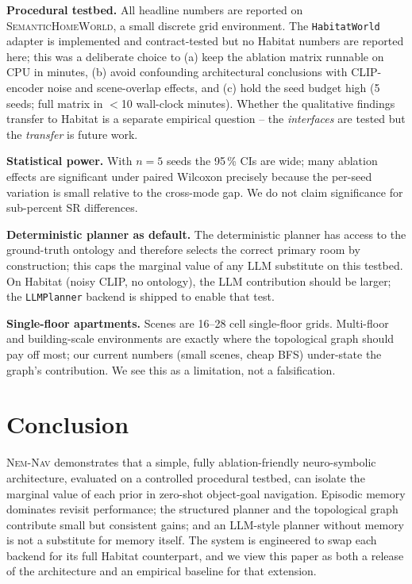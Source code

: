 \documentclass[conference,a4paper,10pt]{IEEEtran}
\begin{document}
\textbf{Procedural testbed.}
All headline numbers are reported on \textsc{SemanticHomeWorld}, a small
discrete grid environment. The \texttt{HabitatWorld} adapter is
implemented and contract-tested but no Habitat numbers are reported
here; this was a deliberate choice to (a) keep the ablation matrix
runnable on CPU in minutes, (b) avoid confounding architectural
conclusions with CLIP-encoder noise and scene-overlap effects, and
(c) hold the seed budget high (5 seeds; full matrix in
$<$10 wall-clock minutes). Whether the qualitative findings transfer
to Habitat is a separate empirical question -- the \emph{interfaces}
are tested but the \emph{transfer} is future work.

\textbf{Statistical power.}
With $n{=}5$ seeds the 95\,\% CIs are wide; many ablation effects are
significant under paired Wilcoxon precisely because the per-seed
variation is small relative to the cross-mode gap. We do not claim
significance for sub-percent SR differences.

\textbf{Deterministic planner as default.}
The deterministic planner has access to the ground-truth ontology and
therefore selects the correct primary room by construction; this caps
the marginal value of any LLM substitute on this testbed. On Habitat
(noisy CLIP, no ontology), the LLM contribution should be larger; the
\texttt{LLMPlanner} backend is shipped to enable that test.

\textbf{Single-floor apartments.}
Scenes are 16--28 cell single-floor grids. Multi-floor and
building-scale environments are exactly where the topological graph
should pay off most; our current numbers (small scenes, cheap BFS)
under-state the graph's contribution. We see this as a limitation, not a
falsification.

\section{Conclusion}

\textsc{Nem-Nav} demonstrates that a simple, fully ablation-friendly
neuro-symbolic architecture, evaluated on a controlled procedural
testbed, can isolate the marginal value of each prior in zero-shot
object-goal navigation. Episodic memory dominates revisit performance;
the structured planner and the topological graph contribute small but
consistent gains; and an LLM-style planner without memory is not a
substitute for memory itself. The system is engineered to swap each
backend for its full Habitat counterpart, and we view this paper as
both a release of the architecture and an empirical baseline for that
extension.
\end{document}
